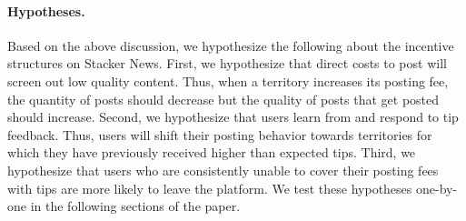 
\paragraph{Hypotheses.} Based on the above discussion, we hypothesize the following about the incentive structures on Stacker News. First, we hypothesize that direct costs to post will screen out low quality content. Thus, when a territory increases its posting fee, the quantity of posts should decrease but the quality of posts that get posted should increase. Second, we hypothesize that users learn from and respond to tip feedback. Thus, users will shift their posting behavior towards territories for which they have previously received higher than expected tips. Third, we hypothesize that users who are consistently unable to cover their posting fees with tips are more likely to leave the platform. We test these hypotheses one-by-one in the following sections of the paper.

